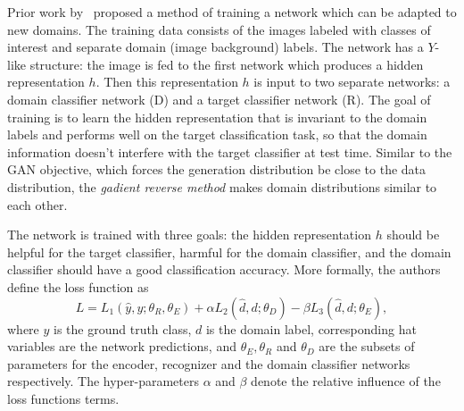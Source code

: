 \documentclass{article}
\begin{document}

    
    Prior work by~\cite{ganin2014unsupervised} proposed a method of training a network 
    which can be adapted to new domains. The training data consists of the images
    labeled with classes of interest and separate domain (image background) labels. 
    The network has a $Y$-like structure: the image is fed to the
    first network which produces a hidden representation $h$. Then this representation $h$ is input to two separate networks: a domain classifier network (D) and 
    a target classifier network (R). The goal of training is to learn the hidden 
    representation that is invariant to the domain labels and performs well on the target classification task, so that the domain information doesn't 
    interfere with the target classifier at test time. Similar to the GAN objective, which forces the generation distribution be close to the data distribution,
    the \emph{gadient reverse method} makes domain distributions similar to each other.

    The network is trained with three goals: the hidden representation $h$ should
    be helpful for the target classifier, harmful for the domain classifier,
    and the domain classifier should have a good classification accuracy. More 
    formally, the authors define the loss function as
    \begin{equation}
        L = L_1(\hat{y}, y; \theta_R, \theta_E) + 
        \alpha L_2(\hat{d}, d; \theta_D) -
        \beta L_3(\hat{d}, d; \theta_E),
        \label{eq:grm}
    \end{equation}
    where $y$ is the ground truth class, $d$ is the domain label, corresponding
    hat variables are the network predictions, and $\theta_E, \theta_R$ and $\theta_D$ are the subsets of  parameters for the encoder,
    recognizer and the domain classifier networks respectively. The hyper-parameters
    $\alpha$ and $\beta$ denote the relative influence of the loss functions terms.
\end{document}
